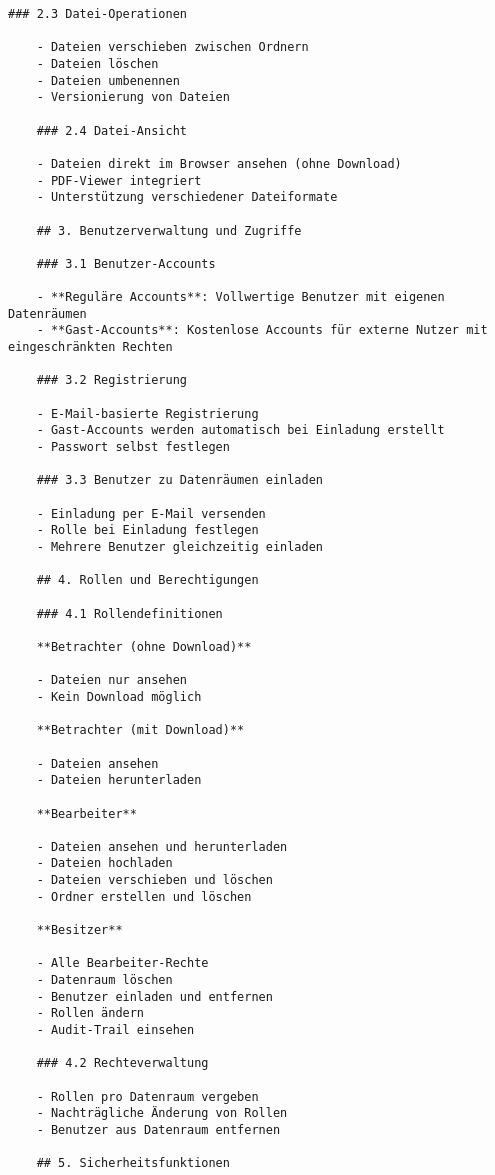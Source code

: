 \begin{Verbatim}[breaklines=true]
    ### 2.3 Datei-Operationen
    
    - Dateien verschieben zwischen Ordnern
    - Dateien löschen
    - Dateien umbenennen
    - Versionierung von Dateien
    
    ### 2.4 Datei-Ansicht
    
    - Dateien direkt im Browser ansehen (ohne Download)
    - PDF-Viewer integriert
    - Unterstützung verschiedener Dateiformate
    
    ## 3. Benutzerverwaltung und Zugriffe
    
    ### 3.1 Benutzer-Accounts
    
    - **Reguläre Accounts**: Vollwertige Benutzer mit eigenen Datenräumen
    - **Gast-Accounts**: Kostenlose Accounts für externe Nutzer mit eingeschränkten Rechten
    
    ### 3.2 Registrierung
    
    - E-Mail-basierte Registrierung
    - Gast-Accounts werden automatisch bei Einladung erstellt
    - Passwort selbst festlegen
    
    ### 3.3 Benutzer zu Datenräumen einladen
    
    - Einladung per E-Mail versenden
    - Rolle bei Einladung festlegen
    - Mehrere Benutzer gleichzeitig einladen
    
    ## 4. Rollen und Berechtigungen
    
    ### 4.1 Rollendefinitionen
    
    **Betrachter (ohne Download)**
    
    - Dateien nur ansehen
    - Kein Download möglich
    
    **Betrachter (mit Download)**
    
    - Dateien ansehen
    - Dateien herunterladen
    
    **Bearbeiter**
    
    - Dateien ansehen und herunterladen
    - Dateien hochladen
    - Dateien verschieben und löschen
    - Ordner erstellen und löschen
    
    **Besitzer**
    
    - Alle Bearbeiter-Rechte
    - Datenraum löschen
    - Benutzer einladen und entfernen
    - Rollen ändern
    - Audit-Trail einsehen
    
    ### 4.2 Rechteverwaltung
    
    - Rollen pro Datenraum vergeben
    - Nachträgliche Änderung von Rollen
    - Benutzer aus Datenraum entfernen
    
    ## 5. Sicherheitsfunktionen
    

\end{Verbatim}
